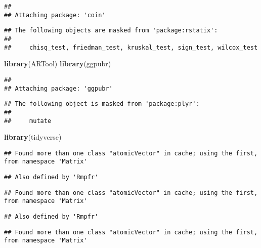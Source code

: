 \documentclass[
]{article}
\newenvironment{Shaded}{\begin{snugshade}}{\end{snugshade}}
\newcommand{\KeywordTok}[1]{\textcolor[rgb]{0.13,0.29,0.53}{\textbf{#1}}}
\newcommand{\NormalTok}[1]{#1}
\begin{document}
\begin{verbatim}
## 
## Attaching package: 'coin'
\end{verbatim}

\begin{verbatim}
## The following objects are masked from 'package:rstatix':
## 
##     chisq_test, friedman_test, kruskal_test, sign_test, wilcox_test
\end{verbatim}

\begin{Shaded}
\begin{Highlighting}[]
\KeywordTok{library}\NormalTok{(ARTool)}
\KeywordTok{library}\NormalTok{(ggpubr)}
\end{Highlighting}
\end{Shaded}

\begin{verbatim}
## 
## Attaching package: 'ggpubr'
\end{verbatim}

\begin{verbatim}
## The following object is masked from 'package:plyr':
## 
##     mutate
\end{verbatim}

\begin{Shaded}
\begin{Highlighting}[]
\KeywordTok{library}\NormalTok{(tidyverse)}
\end{Highlighting}
\end{Shaded}

\begin{verbatim}
## Found more than one class "atomicVector" in cache; using the first, from namespace 'Matrix'
\end{verbatim}

\begin{verbatim}
## Also defined by 'Rmpfr'
\end{verbatim}

\begin{verbatim}
## Found more than one class "atomicVector" in cache; using the first, from namespace 'Matrix'
\end{verbatim}

\begin{verbatim}
## Also defined by 'Rmpfr'
\end{verbatim}

\begin{verbatim}
## Found more than one class "atomicVector" in cache; using the first, from namespace 'Matrix'
\end{verbatim}
\end{document}
